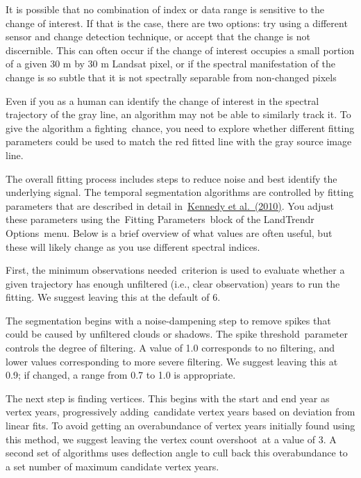 \documentclass[
  letterpaper,
  DIV=11,
  numbers=noendperiod]{scrreprt}
\begin{document}
It is possible that no combination of index or data range is sensitive
to the change of interest. If that is the case, there are two options:
try using a different sensor and change detection technique, or accept
that the change is not discernible. This can often occur if the change
of interest occupies a small portion of a given 30 m by 30 m Landsat
pixel, or if the spectral manifestation of the change is so subtle that
it is not spectrally separable from non-changed pixels

Even if you as a human can identify the change of interest in the
spectral trajectory of the gray line, an algorithm may not be able to
similarly track it. To give the algorithm a fighting~chance, you need to
explore whether different fitting parameters could be used to match the
red fitted line with the gray source image line. ~

The overall fitting process includes steps to reduce noise and best
identify the underlying signal. The temporal segmentation algorithms are
controlled by fitting parameters that are described in detail
in~\href{https://www.google.com/url?q=https://www.zotero.org/google-docs/?Siyubi\&sa=D\&source=editors\&ust=1671458868286041\&usg=AOvVaw1IKLEXLb8EIQLL40vCpog-}{Kennedy
et al.~(2010)}. You adjust these parameters using the~Fitting
Parameters~block of the LandTrendr Options~menu. Below is a brief
overview of what values are often useful, but these will likely change
as you use different spectral indices.

First, the minimum observations needed~criterion is used to evaluate
whether a given trajectory has enough unfiltered (i.e., clear
observation) years to run the fitting. We suggest leaving this at the
default of 6.

The segmentation begins with a noise-dampening step to remove spikes
that could be caused by unfiltered clouds or shadows. The spike
threshold~parameter controls the degree of filtering. A value of 1.0
corresponds to no filtering, and lower values corresponding to more
severe filtering. We suggest leaving this at 0.9; if changed, a range
from 0.7 to 1.0 is appropriate.

The next step is finding vertices. This begins with the start and end
year as vertex years, progressively adding~candidate vertex years based
on deviation from linear fits. To avoid getting an overabundance of
vertex years initially found using this method, we suggest leaving the
vertex count overshoot~at a value of 3. A second set of algorithms uses
deflection angle to cull back this overabundance to a set number of
maximum candidate vertex years.
\end{document}
